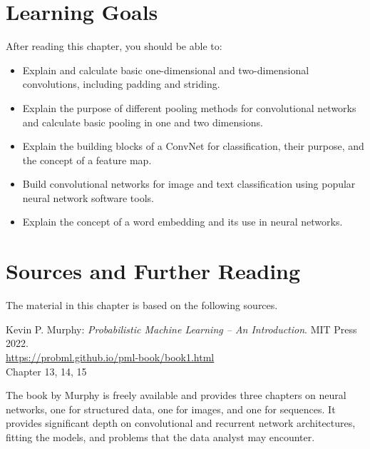 %
%
\section*{Learning Goals}

After reading this chapter, you should be able to:
\begin{itemize}
   \item Explain and calculate basic one-dimensional and two-dimensional convolutions, including padding and striding.
   \item Explain the purpose of different pooling methods for convolutional networks and calculate basic pooling in one and two dimensions.
   \item Explain the building blocks of a ConvNet for classification, their purpose, and the concept of a feature map.
   \item  Build convolutional networks for image and text classification using popular neural network software tools.
   \item Explain the concept of a word embedding and its use in neural networks.
\end{itemize}

\section*{Sources and Further Reading}

The material in this chapter is based on the following sources. 

\begin{resourcebox}
Kevin P. Murphy: \emph{Probabilistic Machine Learning -- An Introduction}. MIT Press 2022. \\

\small\url{https://probml.github.io/pml-book/book1.html}\normalsize \\

Chapter 13, 14, 15
\end{resourcebox}

The book by Murphy is freely available and provides three chapters on neural networks, one for structured data, one for images, and one for sequences. It provides significant depth on convolutional and recurrent network architectures, fitting the models, and problems that the data analyst may encounter. 

